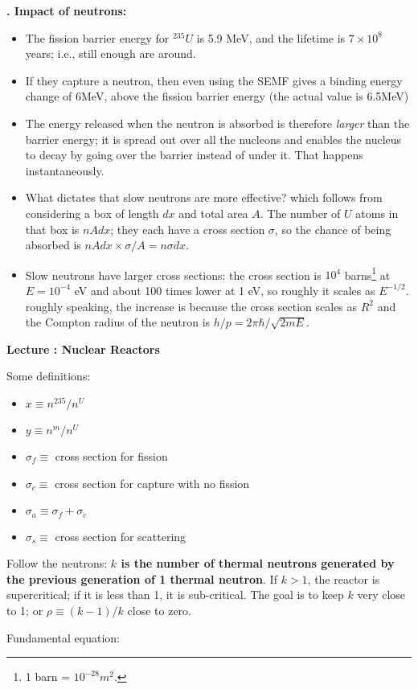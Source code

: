 \documentclass[11pt]{book}
\newcommand\bei{\begin{itemize}}
\newcommand\eei{\end{itemize}}
\newcommand\lecture[1]{\newpage
\addtocounter{lectureno}{1}
\setcounter{secno}{0}
\begin{center}
 {\bf Lecture \arabic{lectureno}: #1}
\end{center}
}
\newcounter{lectureno}
\newcounter{secno}
\newcommand\lsection[1]{
\addtocounter{secno}{1}
{\bf \arabic{lectureno}.\alph{secno} #1:}}
\begin{document}


\lsection{Impact of neutrons}

\bei
\item The fission barrier energy for $^{235}U$ is 5.9 MeV, and the lifetime is $7\times 10^8$ years; i.e., still enough are around.
\item If they capture a neutron, then even using the SEMF gives a binding energy change of 6MeV, above the fission barrier energy (the actual value is 6.5MeV)
\item The energy released when the neutron is absorbed is therefore {\it larger} than the barrier energy; it is spread out over all the nucleons and enables the nucleus to decay by going over the barrier instead of under it. That happens instantaneously.
\item What dictates that slow neutrons are more effective? which follows from considering a box of length $dx$ and total area $A$. The number of $U$ atoms in that box is $nAdx$; they each have a cross section $\sigma$, so the chance of being absorbed is $nAdx \times \sigma/A = n\sigma dx$. 
\item Slow neutrons have larger cross sections: the cross section is $10^4$ barns\footnote{1 barn = $10^{-28}m^2$.} at $E=10^{-4}$ eV and about 100 times lower at 1 eV, so roughly it scales as $E^{-1/2}$. roughly speaking, the increase is because the cross section scales as $R^2$ and the Compton radius of the neutron is $h/p=2\pi\hbar/\sqrt{2mE}$.
\eei


\lecture{Nuclear Reactors}

Some definitions:
\bei
\item $x\equiv n^{235}/n^U$
\item $y\equiv n^m/n^U$
\item $\sigma_f\equiv$ cross section for fission
\item $\sigma_c\equiv$ cross section for capture with no fission
\item $\sigma_a\equiv \sigma_f+\sigma_c$
\item $\sigma_s\equiv$ cross section for scattering
\eei

Follow the neutrons: {\bf $k$ is the number of thermal neutrons generated by the previous generation of 1 thermal neutron}. If $k>1$, the reactor is supercritical; if it is less than 1, it is sub-critical. The goal is to keep $k$ very close to 1; or $\rho\equiv (k-1)/k$ close to zero.

Fundamental equation:
\end{document}
